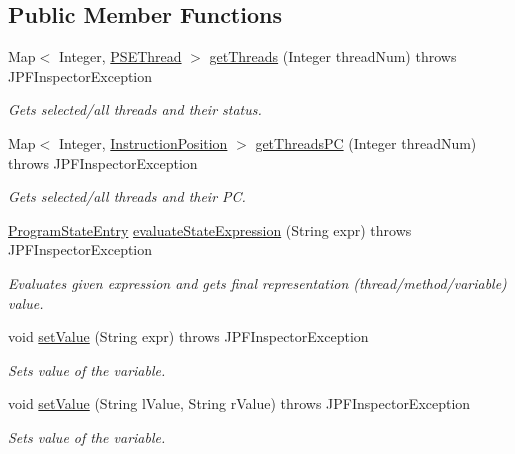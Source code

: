 \subsection*{Public Member Functions}
\begin{DoxyCompactItemize}
\item 
Map$<$ Integer, \hyperlink{classgov_1_1nasa_1_1jpf_1_1inspector_1_1common_1_1pse_1_1_p_s_e_thread}{P\+S\+E\+Thread} $>$ \hyperlink{interfacegov_1_1nasa_1_1jpf_1_1inspector_1_1interfaces_1_1_program_state_interface_a54531453dd2373d8f9f166a79547495a}{get\+Threads} (Integer thread\+Num)  throws J\+P\+F\+Inspector\+Exception
\begin{DoxyCompactList}\small\item\em Gets selected/all threads and their status. \end{DoxyCompactList}\item 
Map$<$ Integer, \hyperlink{interfacegov_1_1nasa_1_1jpf_1_1inspector_1_1interfaces_1_1_instruction_position}{Instruction\+Position} $>$ \hyperlink{interfacegov_1_1nasa_1_1jpf_1_1inspector_1_1interfaces_1_1_program_state_interface_a4ca30deeab5ba91a9ee285aabbdb623a}{get\+Threads\+PC} (Integer thread\+Num)  throws J\+P\+F\+Inspector\+Exception
\begin{DoxyCompactList}\small\item\em Gets selected/all threads and their PC. \end{DoxyCompactList}\item 
\hyperlink{classgov_1_1nasa_1_1jpf_1_1inspector_1_1common_1_1pse_1_1_program_state_entry}{Program\+State\+Entry} \hyperlink{interfacegov_1_1nasa_1_1jpf_1_1inspector_1_1interfaces_1_1_program_state_interface_a3a64e61b42c7338fe4f90c9c8519177f}{evaluate\+State\+Expression} (String expr)  throws J\+P\+F\+Inspector\+Exception
\begin{DoxyCompactList}\small\item\em Evaluates given expression and gets final representation (thread/method/variable) value. \end{DoxyCompactList}\item 
void \hyperlink{interfacegov_1_1nasa_1_1jpf_1_1inspector_1_1interfaces_1_1_program_state_interface_aaf980401ba045fdd70af10cb1c956ee0}{set\+Value} (String expr)  throws J\+P\+F\+Inspector\+Exception
\begin{DoxyCompactList}\small\item\em Sets value of the variable. \end{DoxyCompactList}\item 
void \hyperlink{interfacegov_1_1nasa_1_1jpf_1_1inspector_1_1interfaces_1_1_program_state_interface_a992e2deda1c948e41ae9abcc776eec7b}{set\+Value} (String l\+Value, String r\+Value)  throws J\+P\+F\+Inspector\+Exception
\begin{DoxyCompactList}\small\item\em Sets value of the variable. \end{DoxyCompactList}\end{DoxyCompactItemize}


